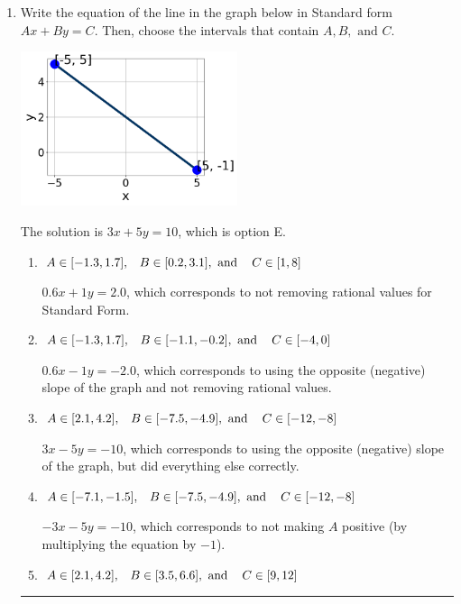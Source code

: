 \documentclass{extbook}[14pt]
\newcommand{\litem}[1]{\item #1

\rule{\textwidth}{0.4pt}}
\begin{document}
\begin{enumerate}\litem{
Write the equation of the line in the graph below in Standard form $Ax+By=C$. Then, choose the intervals that contain $A, B, \text{ and } C$.

\begin{center}
    \includegraphics[width=0.5\textwidth]{../Figures/linearGraphToStandardC.png}
\end{center}




The solution is \( 3x + 5y = 10 \), which is option E.\begin{enumerate}[label=\Alph*.]
\item \( A \in [-1.3, 1.7], \hspace{3mm} B \in [0.2, 3.1], \text{ and } \hspace{3mm} C \in [1, 8] \)

 $0.6x + 1y = 2.0$, which corresponds to not removing rational values for Standard Form.
\item \( A \in [-1.3, 1.7], \hspace{3mm} B \in [-1.1, -0.2], \text{ and } \hspace{3mm} C \in [-4, 0] \)

 $0.6x - 1y = -2.0$, which corresponds to using the opposite (negative) slope of the graph and not removing rational values.
\item \( A \in [2.1, 4.2], \hspace{3mm} B \in [-7.5, -4.9], \text{ and } \hspace{3mm} C \in [-12, -8] \)

 $3x - 5y = -10$, which corresponds to using the opposite (negative) slope of the graph, but did everything else correctly.
\item \( A \in [-7.1, -1.5], \hspace{3mm} B \in [-7.5, -4.9], \text{ and } \hspace{3mm} C \in [-12, -8] \)

 $-3x - 5y = -10$, which corresponds to not making $A$ positive (by multiplying the equation by $-1$).
\item \( A \in [2.1, 4.2], \hspace{3mm} B \in [3.5, 6.6], \text{ and } \hspace{3mm} C \in [9, 12] \)


\end{enumerate}}
\end{enumerate}
\end{document}

